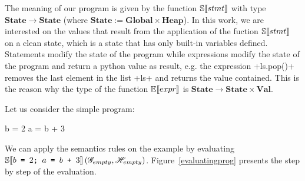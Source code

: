 The meaning of our program is given by the function $\mathbb{S}\!\left\llbracket stmt \right\rrbracket$ with type
$\mathbf{State} \to \mathbf{State}$ (where $\mathbf{State} := \mathbf{Global} \times \mathbf{Heap}$).
In this work, we are interested on the values that result from the application of the
fuction $\mathbb{S}\!\left\llbracket stmt \right\rrbracket$ on a clean state, which is a state that has only built-in variables
defined.  Statements modify the state of the program while expressions modify the state of
the program and return a python value as result, e.g. the expression \pycode+ls.pop()+
removes the last element in the list \pycode+ls+ and returns the value contained. This is
the reason why the type of the function $\mathbb{E}\!\left\llbracket expr \right\rrbracket$ is
$\mathbf{State} \to \mathbf{State} \times \mathbf{Val}$.

Let us consider the simple program:

\begin{pythoncode}
b = 2
a = b + 3
\end{pythoncode}

We can apply the semantics rules on the example by evaluating
$\mathbb{S}\!\left\llbracket b \texttt{ = } 2\texttt{; } a \texttt{ = } b \texttt{ + } 3 \right\rrbracket\left(\mathscr{G}_{empty}, \mathscr{H}_{empty}\right)$.
Figure~\ref{evaluatingprog} presents the step by step of the evaluation.

